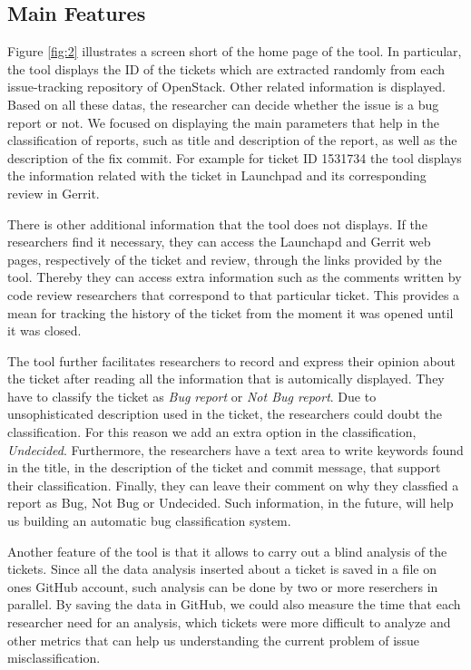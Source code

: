 \documentclass[runningheads,a4paper]{llncs}
\begin{document}
\subsection{Main Features}
\label{sec:2.2}
Figure \ref{fig:2} illustrates a screen short of the home page of the tool. In particular, the tool displays the ID of the tickets which are extracted randomly from each issue-tracking repository of OpenStack. Other related information is displayed. Based on all these datas, the researcher can decide whether the issue is a bug report or not. We focused on displaying the main parameters that help in the classification of reports, such as title and description of the report, as well as the description of the fix commit. For example for ticket ID 1531734 the tool displays the information related with the ticket in Launchpad and its corresponding review in Gerrit.

There is other additional information that the tool does not displays. If the researchers find it necessary, they can access the Launchapd and Gerrit web pages, respectively of the ticket and review, through the links provided by the tool. Thereby they can access extra information such as the comments written by code review researchers that correspond to that particular ticket. This provides a mean for tracking the history of the ticket from the moment it was opened until it was closed.

The tool further facilitates researchers to record and express their opinion about the ticket after reading all the information that is automically displayed. They have to classify the ticket as \textit{Bug report} or \textit{Not Bug report}. Due to unsophisticated description used in the ticket, the researchers could doubt the classification. For this reason we add an extra option in the classification, \textit{Undecided}. Furthermore, the researchers have a text area to write keywords found in the title, in the description of the ticket and commit message, that support their classification.
Finally, they can leave their comment on why they classfied a report as Bug, Not Bug or Undecided. Such information, in the future, will help us building an automatic bug classification system.

Another feature of the tool is that it allows to carry out a blind analysis of the tickets. Since all the data analysis inserted about a ticket is saved in a file on ones GitHub account, such analysis can be done by two or more reserchers in parallel. By saving the data in GitHub, we could also measure the time that each researcher need for an analysis, which tickets were more difficult to analyze and other metrics that can help us understanding the current problem of issue misclassification.
\end{document}
